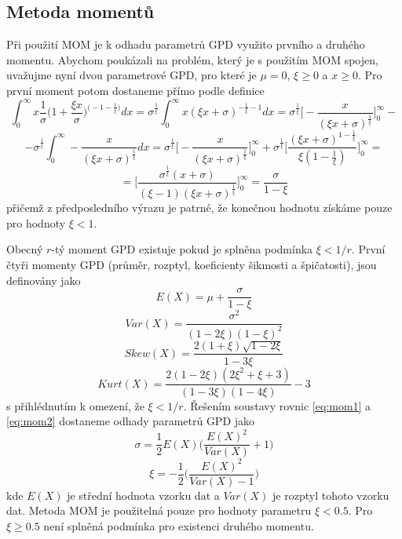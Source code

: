 \subsection{Metoda momentů}
Při použití MOM \cite{mom_orig} je k odhadu parametrů GPD využito prvního a druhého momentu. 
Abychom poukázali na problém, který je s použitím MOM spojen, uvažujme nyní dvou parametrové GPD, pro které je $\mu=0$, $\xi \geq 0$ a $x \geq 0$. 
Pro první moment potom dostaneme přímo podle definice
\begin{equation*}
\int_{0}^{\infty}x\frac{1}{\sigma}\Bigg(1+\frac{\xi x}{\sigma}\Bigg)^{\Big(-1-\frac{1}{\xi}\Big)}dx=\sigma^{\frac{1}{\xi}}\int_{0}^{\infty}x(\xi x + \sigma)^{-\frac{1}{\xi}-1}dx=\sigma^{\frac{1}{\xi}}\Bigg[-\frac{x}{(\xi x + \sigma)^{\frac{1}{\xi}}}\Bigg]_0^{\infty}-
\end{equation*}
\begin{equation*}
-\sigma^{\frac{1}{\xi}}\int_{0}^{\infty}-\frac{x}{(\xi x + \sigma)^{\frac{1}{\xi}}} dx=\sigma^{\frac{1}{\xi}}\Bigg[-\frac{x}{(\xi x + \sigma)^{\frac{1}{\xi}}}\Bigg]_0^{\infty} + \sigma^{\frac{1}{\xi}}\Bigg[\frac{(\xi x + \sigma)^{1-\frac{1}{\xi}}}{\xi(1-\frac{1}{\xi})}\Bigg]_0^{\infty}=
\end{equation*}
\begin{equation}
=\Bigg[\frac{\sigma^{\frac{1}{\xi}}(x+\sigma)}{(\xi-1)(\xi x+\sigma)^{\frac{1}{\xi}}}\Bigg]_0^{\infty}=\frac{\sigma}{1-\xi}
\end{equation}
přičemž z předposledního výrazu je patrné, že konečnou hodnotu získáme pouze pro hodnoty $\xi < 1$. 

\par
Obecný $r$-tý moment GPD existuje pokud je splněna podmínka $\xi < 1/r$.
První čtyři momenty GPD (průměr, rozptyl, koeficienty šikmosti a špičatosti), jsou definovány jako
\begin{equation}\label{eq:mom1}
E(X)=\mu+\frac{\sigma}{1-\xi}
\end{equation}
\begin{equation}\label{eq:mom2}
Var(X)=\frac{\sigma^2}{(1-2\xi)(1-\xi)^2}
\end{equation}
\begin{equation}\label{eq:mom3}
Skew(X)=\frac{2(1+\xi)\sqrt{1-2\xi}}{1-3\xi}
\end{equation}
\begin{equation}
Kurt(X)=\frac{2(1-2\xi)(2\xi^2+\xi+3)}{(1-3\xi)(1-4\xi)}-3
\end{equation}
s přihlédnutím k omezení, že $\xi < 1/r$. Řešením soustavy rovnic \ref{eq:mom1} a \ref{eq:mom2} dostaneme odhady parametrů GPD jako
\begin{equation}
\sigma=\frac{1}{2}E(X)\Bigg(\frac{E(X)^2}{Var(X)}+1\Bigg)
\end{equation}
\begin{equation}
\xi=-\frac{1}{2}\Bigg(\frac{E(X)^2}{Var(X)-1}\Bigg)
\end{equation}
kde $E(X)$ je střední hodnota vzorku dat a $Var(X)$ je rozptyl tohoto vzorku dat. Metoda MOM je použitelná pouze pro hodnoty parametru $\xi < 0.5$. Pro $\xi \geq 0.5$ není splněná podmínka pro existenci druhého momentu. 

